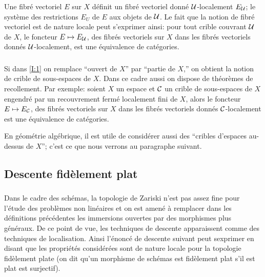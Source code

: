 \documentclass[oneside]{book}
\begin{document}
\subsubsection{}\label{I:1-3-3}

Une fibré vectoriel $E$ sur $X$ définit un fibré vectoriel donné 
$\mathcal{U}$-localement $E_{\mathcal{U}}$; le système des restrictions $E_U$ de $E$ aux objets 
de $\mathcal{U}$. Le fait que la notion de fibré vectoriel est de nature locale peut 
s'exprimer ainsi: pour tout crible couvrant $\mathcal{U}$ de $X$, le foncteur 
$E\mapsto E_{\mathcal{U}}$, des fibrés vectoriels sur $X$ dans les fibrés vectoriels 
donnés $\mathcal{U}$-localement, est une équivalence de catégories. 





\subsubsection{}\label{I:1-3-4}

Si dans \ref{I:1} on remplace ``ouvert de $X$'' par ``partie de 
$X$,'' on obtient la notion de crible de sous-espaces de $X$. Dans ce cadre 
aussi on dispose de théorèmes de recollement. Par exemple: soient $X$ un 
espace et $\mathcal{C}$ un crible de sous-espaces de $X$ engendré par un recouvrement 
fermé localement fini de $X$, alors le foncteur $E\mapsto E_{\mathcal{C}}$, des fibrés 
vectoriels sur $X$ dans les fibrés vectoriels donnés $\mathcal{C}$-localement est une 
équivalence de catégories. 

En géométrie algébrique, il est utile de considérer aussi des ``cribles 
d'espaces au-dessus de $X$''; c'est ce que nous verrons au paragraphe suivant. 










\subsection{Descente fidèlement plat}\label{I:1-4}





\subsubsection{}\label{I:1-4-1}

Dans le cadre des schémas, la topologie de Zariski n'est pas assez fine pour 
l'étude des problèmes non linéaires et on est amené à remplacer dans les 
définitions précédentes les immersions ouvertes par des morphismes plus 
généraux. De ce point de vue, les techniques de descente apparaissent comme des 
techniques de localisation. Ainsi l'énoncé de descente suivant peut sexprimer 
en disant que les propriétés considérées sont de nature locale pour la 
topologie fidèlement plate (on dit qu'un morphisme de schémas est fidèlement 
plat s'il est plat est surjectif). 
\end{document}
